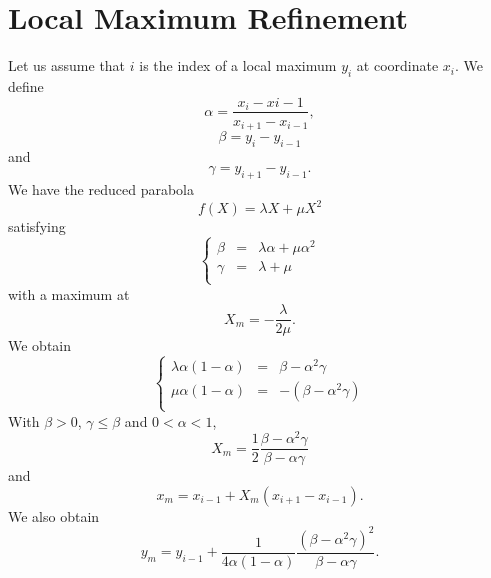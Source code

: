 \documentclass[aps,twocolumn]{revtex4}
\begin{document}
\section{Local Maximum Refinement}
Let us assume that $i$ is the index of a local maximum $y_i$ at coordinate $x_i$.
We define
\begin{equation}
	\alpha = \dfrac{x_{i}-x{i-1}}{x_{i+1}-x_{i-1}},
\end{equation}
\begin{equation}
	\beta  = y_i - y_{i-1}
\end{equation}
and
\begin{equation}
	\gamma = y_{i+1} - y_{i-1}.
\end{equation}
We have the reduced parabola
\begin{equation}
	f(X) = \lambda X + \mu X^2
\end{equation}
satisfying
\begin{equation}
	\left\lbrace
	\begin{array}{rcl}
	\beta  & = & \lambda \alpha + \mu \alpha^2\\
	\gamma & = & \lambda+\mu\\
	\end{array}
	\right.
\end{equation}
with a maximum at
\begin{equation}
	X_m = -\dfrac{\lambda}{2\mu}.
\end{equation}
We obtain
\begin{equation}
	\left\lbrace
	\begin{array}{rcl}
	\lambda \alpha(1-\alpha) & = & \beta - \alpha^2\gamma \\
	\mu     \alpha(1-\alpha) & = & -(\beta - \alpha^2\gamma)  \\
	\end{array}
	\right.
\end{equation}
With $\beta>0$, $\gamma\leq\beta$ and $0<\alpha<1$, 
\begin{equation}
	X_m = \dfrac{1}{2} \dfrac{\beta - \alpha^2\gamma}{\beta - \alpha\gamma}
\end{equation}
and
\begin{equation}
	x_m = x_{i-1} + X_m \left(x_{i+1}-x_{i-1}\right).
\end{equation}
We also obtain
\begin{equation}
	y_m = y_{i-1} + \dfrac{1}{4\alpha\left(1-\alpha\right)} \dfrac{\left(\beta - \alpha^2\gamma\right)^2}{\beta-\alpha\gamma}.
\end{equation}
\end{document}
